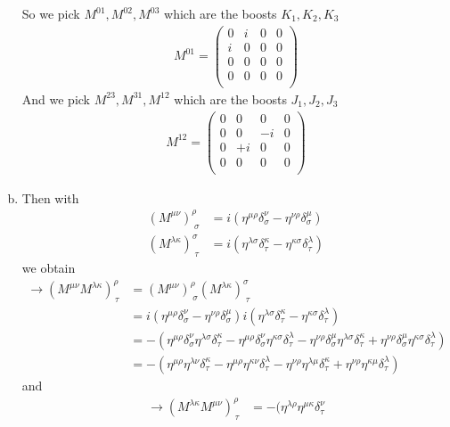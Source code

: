 \documentclass[../main.tex]{subfiles}
\begin{document}
\begin{enumerate}[(a)]
So we pick $M^{01},M^{02},M^{03}$ which are the boosts $K_1,K_2,K_3$
\begin{align}
M^{01}=\left(
\begin{matrix}
0&i&0&0\\
i&0&0&0\\
0&0&0&0\\
0&0&0&0\\
\end{matrix}
\right)
\end{align}
And we pick $M^{23},M^{31},M^{12}$ which are the boosts $J_1,J_2,J_3$
\begin{align}
M^{12}=\left(
\begin{matrix}
0&0&0&0\\
0&0&-i&0\\
0&+i&0&0\\
0&0&0&0\\
\end{matrix}
\right)
\end{align}
\item Then with
\begin{align}
(M^{\mu\nu})^\rho_{\;\sigma}
&=i(\eta^{\mu\rho}\delta^\nu_\sigma-\eta^{\nu\rho}\delta^\mu_\sigma)\\
(M^{\lambda\kappa})^\sigma_{\;\tau}
&=i(\eta^{\lambda\sigma}\delta^\kappa_\tau-\eta^{\kappa\sigma}\delta^\lambda_\tau)
\end{align}
we obtain
\begin{align}
\rightarrow (M^{\mu\nu}M^{\lambda\kappa})^\rho_{\,\tau}
&=(M^{\mu\nu})^\rho_{\;\sigma}(M^{\lambda\kappa})^\sigma_{\;\tau}\\
&=i(\eta^{\mu\rho}\delta^\nu_\sigma-\eta^{\nu\rho}\delta^\mu_\sigma)i(\eta^{\lambda\sigma}\delta^\kappa_\tau-\eta^{\kappa\sigma}\delta^\lambda_\tau)\\
&=-(
\eta^{\mu\rho}\delta^\nu_\sigma \eta^{\lambda\sigma}\delta^\kappa_\tau
-\eta^{\mu\rho}\delta^\nu_\sigma\eta^{\kappa\sigma}\delta^\lambda_\tau
-\eta^{\nu\rho}\delta^\mu_\sigma\eta^{\lambda\sigma}\delta^\kappa_\tau
+\eta^{\nu\rho}\delta^\mu_\sigma\eta^{\kappa\sigma}\delta^\lambda_\tau
)\\
&=-(
\eta^{\mu\rho}\eta^{\lambda\nu}\delta^\kappa_\tau
-\eta^{\mu\rho}\eta^{\kappa\nu}\delta^\lambda_\tau
-\eta^{\nu\rho}\eta^{\lambda\mu}\delta^\kappa_\tau
+\eta^{\nu\rho}\eta^{\kappa\mu}\delta^\lambda_\tau
)
\end{align}
and
\begin{align}
\rightarrow (M^{\lambda\kappa}M^{\mu\nu})^\rho_{\,\tau}
&=-(
\eta^{\lambda\rho}\eta^{\mu\kappa}\delta^\nu_\tau

\end{align}
\end{enumerate}
\end{document}
